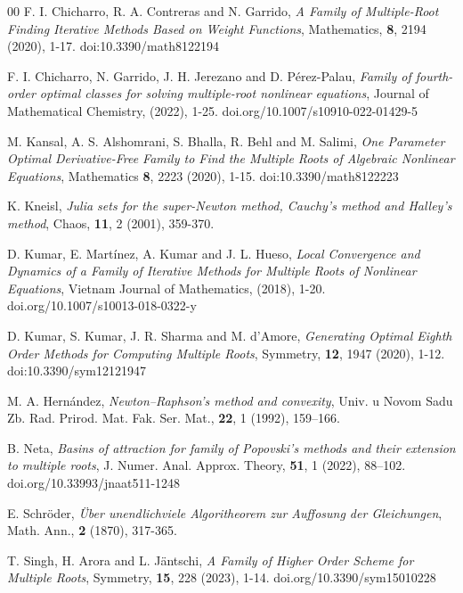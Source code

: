 \documentclass{article}
\theoremstyle{definition}
\theoremstyle{remark}
\begin{document}
\begin{thebibliography}{00}
	 F. I. Chicharro, R. A. Contreras and N. Garrido, \emph{A Family of Multiple-Root Finding Iterative Methods Based on Weight Functions}, Mathematics,  \textbf{8}, 2194 (2020), 1-17. doi:10.3390/math8122194

	 F. I. Chicharro, N. Garrido, J. H. Jerezano and D. Pérez-Palau, \emph{Family of fourth-order optimal classes for solving multiple-root nonlinear equations}, Journal of Mathematical Chemistry, (2022), 1-25. doi.org/10.1007/s10910-022-01429-5


	 M. Kansal, A. S. Alshomrani, S. Bhalla, R. Behl and M. Salimi, \emph{One Parameter Optimal Derivative-Free Family to Find the Multiple Roots of Algebraic Nonlinear Equations}, Mathematics \textbf{8}, 2223 (2020), 1-15. doi:10.3390/math8122223



	 K. Kneisl, \emph{Julia sets for the super-Newton method, Cauchy’s method and Halley’s method}, Chaos, \textbf{11}, 2 (2001), 359-370.

	 D. Kumar, E. Mart\'inez, A. Kumar and J. L. Hueso, \emph{Local Convergence and Dynamics of a Family of Iterative 	Methods for Multiple Roots of Nonlinear Equations}, Vietnam Journal of Mathematics, (2018), 1-20. doi.org/10.1007/s10013-018-0322-y

	 D. Kumar, S. Kumar, J. R. Sharma and M. d’Amore, \emph{Generating Optimal Eighth Order Methods for Computing Multiple Roots}, Symmetry, \textbf{12}, 1947 (2020), 1-12. doi:10.3390/sym12121947

	 M. A. Hern\'andez, \emph{Newton–Raphson’s method and convexity}, Univ. u Novom Sadu Zb. Rad. Prirod. Mat. Fak. Ser. Mat., \textbf{22}, 1 (1992), 159–166.

	 B. Neta, \emph{Basins of attraction for family of Popovski’s methods and their extension to multiple roots}, J. Numer. Anal. Approx. Theory, \textbf{51}, 1 (2022), 88–102. doi.org/10.33993/jnaat511-1248

	 {E. Schr\"{o}der}, \emph{\"{U}ber unendlichviele Algoritheorem zur Auffosung der Gleichungen}, Math. Ann., \textbf{2} (1870), 317-365.

	 T. Singh, H. Arora and L. Jäntschi, \emph{A Family of Higher Order Scheme for Multiple Roots}, Symmetry, \textbf{15}, 228 (2023), 1-14. doi.org/10.3390/sym15010228


\end{thebibliography}
\end{document}
